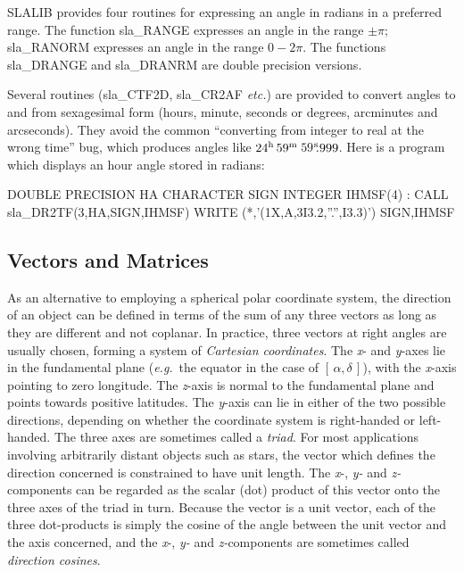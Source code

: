 \documentclass[11pt,twoside,nolof]{starlink}
\providecommand{\radec}     {$[\,\alpha,\delta\,]$}
\providecommand{\tseci}[1]   {$#1$\mbox{$^{\rm s}$}}
\providecommand{\tsec}[2]    {\tseci{#1}$\hspace{-0.3em}.#2$}
\providecommand{\hms}[4]    {$#1^{\rm h}\,#2^{\rm m}\,$\tsec{#3}{#4}}
\begin{document}
SLALIB provides four routines for expressing an angle in radians
in a preferred range.  The function
sla\_RANGE
expresses an angle
in the range $\pm\pi$;
sla\_RANORM
expresses an angle in the range
$0-2\pi$.  The functions
sla\_DRANGE
and
sla\_DRANRM
are double precision versions.

Several routines
(sla\_CTF2D,
sla\_CR2AF
\textit{etc.}) are provided to convert
angles to and from
sexagesimal form (hours, minute, seconds or degrees,
arcminutes and arcseconds).
They avoid the common
``converting from integer to real at the wrong time''
bug, which produces angles like \hms{24}{59}{59}{999}.
Here is a program which displays an hour angle
stored in radians:
\goodbreak
\begin{terminalv}
            DOUBLE PRECISION HA
            CHARACTER SIGN
            INTEGER IHMSF(4)
            :
            CALL sla_DR2TF(3,HA,SIGN,IHMSF)
            WRITE (*,'(1X,A,3I3.2,''.'',I3.3)') SIGN,IHMSF
\end{terminalv}
\goodbreak

\subsection {Vectors and Matrices}
As an alternative to employing a spherical polar coordinate system,
the direction of an object can be defined in terms of the sum of any
three vectors as long as they are different and
not coplanar.  In practice, three vectors at right angles are
usually chosen, forming a system
of \textit{Cartesian coordinates}.  The \textit{x}- and \textit{y}-axes
lie in the fundamental plane (\textit{e.g.}\ the equator in the
case of \radec), with the \textit{x}-axis pointing to zero longitude.
The \textit{z}-axis is normal to the fundamental plane and points
towards positive latitudes.  The \textit{y}-axis can lie in either
of the two possible directions, depending on whether the
coordinate system is right-handed or left-handed.
The three axes are sometimes called
a \textit{triad}.  For most applications involving arbitrarily
distant objects such as stars, the vector which defines
the direction concerned is constrained to have unit length.
The \textit{x}-, \textit{y-} and \textit{z-}components
can be regarded as the scalar (dot) product of this vector
onto the three axes of the triad in turn.  Because the vector
is a unit vector,
each of the three dot-products is simply the cosine of the angle
between the unit vector and the axis concerned, and the
\textit{x}-, \textit{y-} and \textit{z-}components are sometimes
called \textit{direction cosines}.
\end{document}

